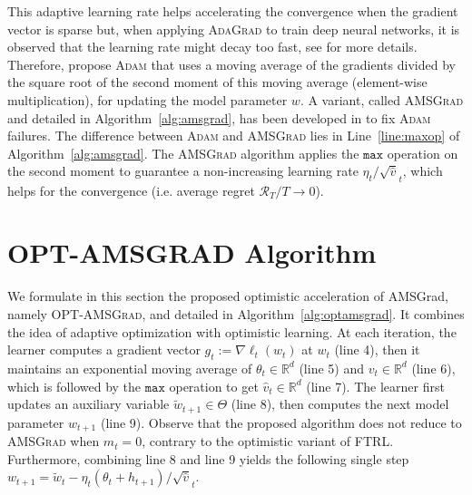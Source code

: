 \documentclass[twoside]{article}
\begin{document}
This adaptive learning rate helps accelerating the convergence when the gradient vector is sparse \citep{DHS11} but, when applying \textsc{AdaGrad} to train deep neural networks, it is observed that the learning rate might decay too fast, see \citep{KB15} for more details.
Therefore, \cite{KB15} propose \textsc{Adam} that uses a moving average of the gradients divided by the square root of the second moment of this moving average (element-wise multiplication), for updating the model parameter $w$.
A variant, called \textsc{AMSGrad} and detailed in Algorithm~\ref{alg:amsgrad}, has been developed in \citep{RKK18} to fix \textsc{Adam} failures.
The difference between \textsc{Adam} and \textsc{AMSGrad} lies in Line~\ref{line:maxop} of Algorithm~\ref{alg:amsgrad}.
The \textsc{AMSGrad} algorithm \citep{RKK18} applies the $\texttt{max}$ operation on the second moment to guarantee a non-increasing learning rate $\eta_t / \sqrt{\hat{v}}_t $, which helps for the convergence (i.e. average regret $\mathcal{R}_T/T \rightarrow 0$).


\vspace{-0.1in}
\section{\textsc{OPT-AMSGRAD} Algorithm}\label{sec:opt}
\vspace{-0.05in}

We formulate in this section the proposed optimistic acceleration of AMSGrad, namely \textsc{OPT-AMSGrad}, and detailed in Algorithm~\ref{alg:optamsgrad}.  
It combines the idea of adaptive optimization with optimistic learning. 
At each iteration, the learner computes a gradient vector $g_{t}:= \nabla \ell_t( w_t)$ at $w_{t}$ (line 4), then it maintains an exponential moving average of $\theta_{t} \in \mathbb R^{d}$ (line 5) and $v_{t} \in \mathbb R^{d}$ (line 6), which is followed by the $\texttt{max}$ operation to get $\hat{v}_{t} \in \mathbb R^{d}$ (line 7). 
The learner first updates an auxiliary variable $\tilde{w}_{t+1} \in \Theta$ (line 8), then computes the next model parameter $w_{t+1}$ (line 9).
Observe that the proposed algorithm does not reduce to \textsc{AMSGrad} when $m_{t}=0$, contrary to the optimistic variant of \textsc{FTRL}.
Furthermore, combining line 8 and line 9 yields the following single step $w_{t+1}= \tilde{w}_{t}  - \eta_t (\theta_t + h_{t+1} )/ \sqrt{\hat{v}}_t $. 
\end{document}
